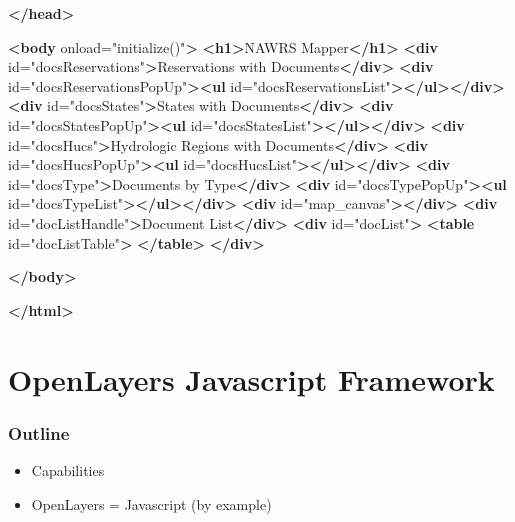 \documentclass[]{article}
\newenvironment{Shaded}{}{}
\newcommand{\KeywordTok}[1]{\textcolor[rgb]{0.00,0.44,0.13}{\textbf{{#1}}}}
\newcommand{\StringTok}[1]{\textcolor[rgb]{0.25,0.44,0.63}{{#1}}}
\newcommand{\OtherTok}[1]{\textcolor[rgb]{0.00,0.44,0.13}{{#1}}}
\newcommand{\NormalTok}[1]{{#1}}
\begin{document}
\begin{Shaded}
\begin{Highlighting}[numbers=left,,]
\KeywordTok{</head>}

\KeywordTok{<body}\OtherTok{ onload=}\StringTok{"initialize()"}\KeywordTok{>}
  \KeywordTok{<h1>}\NormalTok{NAWRS Mapper}\KeywordTok{</h1>}
  \KeywordTok{<div}\OtherTok{ id=}\StringTok{"docsReservations"}\KeywordTok{>}\NormalTok{Reservations with Documents}\KeywordTok{</div>}
  \KeywordTok{<div}\OtherTok{ id=}\StringTok{"docsReservationsPopUp"}\KeywordTok{><ul}\OtherTok{ id=}\StringTok{"docsReservationsList"}\KeywordTok{></ul></div>}
  \KeywordTok{<div}\OtherTok{ id=}\StringTok{"docsStates"}\KeywordTok{>}\NormalTok{States with Documents}\KeywordTok{</div>}
  \KeywordTok{<div}\OtherTok{ id=}\StringTok{"docsStatesPopUp"}\KeywordTok{><ul}\OtherTok{ id=}\StringTok{"docsStatesList"}\KeywordTok{></ul></div>}
  \KeywordTok{<div}\OtherTok{ id=}\StringTok{"docsHucs"}\KeywordTok{>}\NormalTok{Hydrologic Regions with Documents}\KeywordTok{</div>}
  \KeywordTok{<div}\OtherTok{ id=}\StringTok{"docsHucsPopUp"}\KeywordTok{><ul}\OtherTok{ id=}\StringTok{"docsHucsList"}\KeywordTok{></ul></div>}
  \KeywordTok{<div}\OtherTok{ id=}\StringTok{"docsType"}\KeywordTok{>}\NormalTok{Documents by Type}\KeywordTok{</div>}
  \KeywordTok{<div}\OtherTok{ id=}\StringTok{"docsTypePopUp"}\KeywordTok{><ul}\OtherTok{ id=}\StringTok{"docsTypeList"}\KeywordTok{></ul></div>}
  \KeywordTok{<div}\OtherTok{ id=}\StringTok{"map_canvas"}\KeywordTok{></div>}
  \KeywordTok{<div}\OtherTok{ id=}\StringTok{"docListHandle"}\KeywordTok{>}\NormalTok{Document List}\KeywordTok{</div>}
  \KeywordTok{<div}\OtherTok{ id=}\StringTok{"docList"}\KeywordTok{>}
    \KeywordTok{<table}\OtherTok{ id=}\StringTok{"docListTable"}\KeywordTok{>}
  \KeywordTok{</table>}
  \KeywordTok{</div>}
  
\KeywordTok{</body>}

\KeywordTok{</html>}
\end{Highlighting}
\end{Shaded}

\section{OpenLayers Javascript
Framework}\label{openlayers-javascript-framework}

\subsubsection{Outline}\label{outline-1}

\begin{itemize}
\item
  Capabilities
\item
  OpenLayers = Javascript (by example)
\end{itemize}
\end{document}
